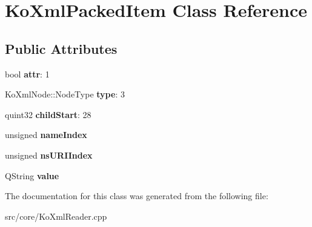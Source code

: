 \hypertarget{classKoXmlPackedItem}{
\section{KoXmlPackedItem Class Reference}
\label{classKoXmlPackedItem}
}
\subsection*{Public Attributes}
\begin{DoxyCompactItemize}
\item 
\hypertarget{classKoXmlPackedItem_a0b7b609c43d77ee1fc69f4aa7208a5bf}{
bool {\bfseries attr}: 1}
\label{classKoXmlPackedItem_a0b7b609c43d77ee1fc69f4aa7208a5bf}

\item 
\hypertarget{classKoXmlPackedItem_a5306a5841c9f28d02c2149b1e49ff922}{
KoXmlNode::NodeType {\bfseries type}: 3}
\label{classKoXmlPackedItem_a5306a5841c9f28d02c2149b1e49ff922}

\item 
\hypertarget{classKoXmlPackedItem_a3b9f9d8c232161d1b07370a6aa3af811}{
quint32 {\bfseries childStart}: 28}
\label{classKoXmlPackedItem_a3b9f9d8c232161d1b07370a6aa3af811}

\item 
\hypertarget{classKoXmlPackedItem_af84d875746ce892206ec7e987b05e312}{
unsigned {\bfseries nameIndex}}
\label{classKoXmlPackedItem_af84d875746ce892206ec7e987b05e312}

\item 
\hypertarget{classKoXmlPackedItem_a57b6a5da2ca2dfcc4761ac34115cd539}{
unsigned {\bfseries nsURIIndex}}
\label{classKoXmlPackedItem_a57b6a5da2ca2dfcc4761ac34115cd539}

\item 
\hypertarget{classKoXmlPackedItem_ac16f729838861087c1174e3bd98ce69e}{
QString {\bfseries value}}
\label{classKoXmlPackedItem_ac16f729838861087c1174e3bd98ce69e}

\end{DoxyCompactItemize}


The documentation for this class was generated from the following file:\begin{DoxyCompactItemize}
\item 
src/core/KoXmlReader.cpp\end{DoxyCompactItemize}
